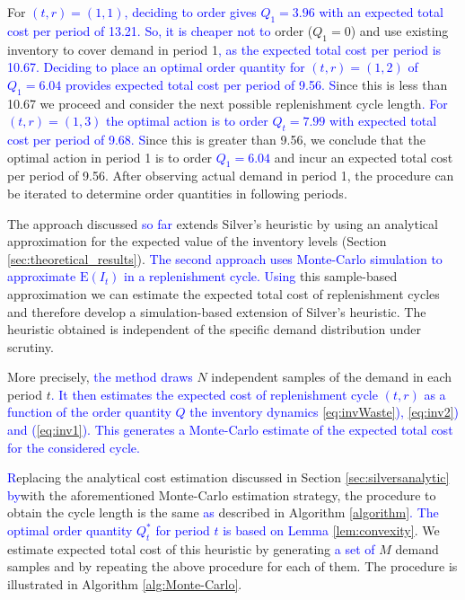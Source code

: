 \documentclass{tPRS2e}
\newcommand{\blue}{\textcolor{blue}}
\begin{document}
For \blue{$(t,r)=(1,1)$, deciding to order gives $Q_1=3.96$ with an expected total cost per period of 13.21. So, it is cheaper not to} order ($Q_1=0$) and use existing inventory to cover demand in period 1\blue{, as the expected total cost per period is 10.67. Deciding to place an optimal order quantity for $(t,r)=(1,2)$ %
of $Q_1=6.04$ provides expected total cost per period of 9.56. S}ince this is less than 10.67 we proceed and consider the next possible replenishment cycle length\blue{. For $(t,r)=(1,3)$ the optimal action is to order $Q_t=7.99$ with expected total cost per period of 9.68. S}ince this is greater than 9.56, we conclude that the optimal action in period 1 is to order \blue{$Q_1=6.04$} and incur an expected total cost per period of 9.56. After observing actual demand in period 1, the procedure can be iterated to determine order quantities in following periods.




The approach discussed \blue{so far} extends Silver's heuristic by using an analytical approximation for the expected value of the inventory levels (Section \ref{sec:theoretical_results}). \blue{The second approach uses Monte-Carlo simulation to approximate $\mathrm{E}({I}_t)$ in a replenishment cycle. Using} this sample-based approximation we can estimate the expected total cost of replenishment cycles and therefore develop a simulation-based extension of Silver's heuristic. The heuristic obtained is independent of the specific demand distribution under scrutiny.

More precisely, \blue{the method draws} $N$ independent samples of the demand in each period $t$\blue{. It then estimates the expected cost of replenishment cycle $(t,r)$ as a function of the order quantity $Q$%
the inventory dynamics \eqref{eq:invWaste}), \eqref{eq:inv2}) and (\eqref{eq:inv1}). This generates a Monte-Carlo estimate of the expected total cost for the considered cycle.} 

\blue{R}eplacing the analytical cost estimation discussed in Section \ref{sec:silversanalytic} \blue{by}with the aforementioned Monte-Carlo estimation strategy, the procedure to obtain the cycle length is the same \blue{as} described in Algorithm \ref{algorithm}\blue{.} %
\blue{The optimal order quantity $Q^*_t$ for period $t$ is based on Lemma \ref{lem:convexity}}.
We estimate expected total cost of this heuristic by generating \blue{a set of} $M$ demand samples and by repeating the above procedure for each of them. The procedure is illustrated in Algorithm \ref{alg:Monte-Carlo}.
\end{document}
